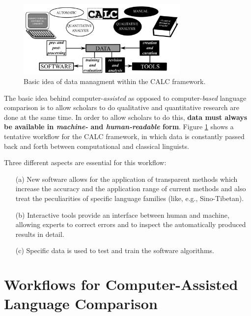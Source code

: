 \documentclass[xetex]{scrartcl}
\begin{document}
\begin{figure}[htb]
  \centering
  \includegraphics[width=0.75\textwidth]{calc-figure-1.png}
  \caption{Basic idea of data managment within the CALC framework.}
  \label{fig:calc}
\end{figure}

The basic idea behind computer-\emph{assisted} as opposed to computer-\emph{based} language
comparison is to allow scholars to do qualitative and
quantitative research are done at the same time. In order to allow scholars to do this, \textbf{data
must always be available in \emph{machine-} and \emph{human-readable} form}.
Figure \ref{fig:calc} shows a tentative workflow for the CALC framework, in which data is constantly passed back and
forth between computational and classical linguists.

Three different aspects are essential for this workflow:
\begin{itemize}
  \item[(a)] New
software allows for the application of transparent methods which increase the accuracy and the application range
of current methods and also treat the peculiarities of specific language families (like, e.g.,
Sino-Tibetan).
\item[(b)] Interactive tools provide
an interface between human and machine, allowing experts to correct errors and to inspect the automatically
produced results in detail.
\item[(c)] Specific data is used to test and train the software algorithms.
  \end{itemize}



\section{Workflows for Computer-Assisted Language Comparison}
\end{document}
